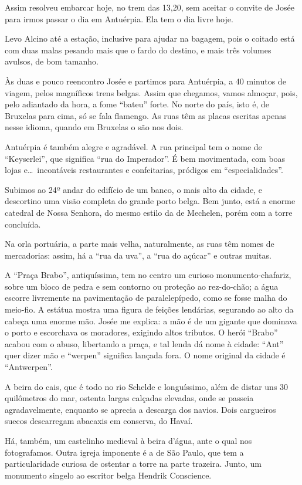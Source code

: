 Assim resolveu embarcar hoje, no trem das 13,20, sem aceitar o convite de Josée para irmos passar o dia em Antuérpia. Ela tem o dia livre hoje.

Levo Alcino até a estação, inclusive para ajudar na bagagem, pois o coitado está com duas malas pesando mais que o fardo do destino, e mais três volumes avulsos, de bom tamanho.

Às duas e pouco reencontro Josée e partimos para Antuérpia, a 40 minutos de viagem, pelos magníficos trens belgas. Assim que chegamos, vamos almoçar, pois, pelo adiantado da hora, a fome ``bateu'' forte. No norte do país, isto é, de Bruxelas para cima, só se fala flamengo. As ruas têm as placas escritas apenas nesse idioma, quando em Bruxelas o são nos dois.

Antuérpia é também alegre e agradável. A rua principal tem o nome de ``Keyserlei'', que significa ``rua do Imperador''. É bem movimentada, com boas lojas e\ldots\ incontáveis restaurantes e confeitarias, pródigos em ``especialidades''.

Subimos ao 24º andar do edifício de um banco, o mais alto da cidade, e descortino uma visão completa do grande porto belga. Bem junto, está a enorme catedral de Nossa Senhora, do mesmo estilo da de Mechelen, porém com a torre concluída.

Na orla portuária, a parte mais velha, naturalmente, as ruas têm nomes de mercadorias: assim, há a ``rua da uva'', a ``rua do açúcar'' e outras muitas.

A ``Praça Brabo'', antiquíssima, tem no centro um curioso monumento-chafariz, sobre um bloco de pedra e sem contorno ou proteção ao rez-do-chão; a água escorre livremente na pavimentação de paralelepípedo, como se fosse malha do meio-fio. A estátua mostra uma figura de feições lendárias, segurando ao alto da cabeça uma enorme mão. Josée me explica: a mão é de um gigante que dominava o porto e escorchava os moradores, exigindo altos tributos. O herói ``Brabo'' acabou com o abuso, libertando a praça, e tal lenda dá nome à cidade: ``Ant'' quer dizer mão e ``werpen'' significa lançada fora. O nome original da cidade é ``Antwerpen''.

A beira do cais, que é todo no rio Schelde e longuíssimo, além de distar uns 30 quilômetros do mar, ostenta largas calçadas elevadas, onde se passeia agradavelmente, enquanto se aprecia a descarga dos navios. Dois cargueiros suecos descarregam abacaxis em conserva, do Havaí.

Há, também, um castelinho medieval à beira d'água, ante o qual nos fotografamos. Outra igreja imponente é a de São Paulo, que tem a particularidade curiosa de ostentar a torre na parte trazeira. Junto, um monumento singelo ao escritor belga Hendrik Conscience.

